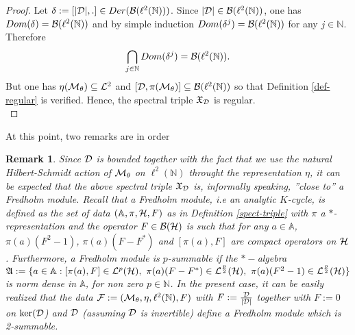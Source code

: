 \documentclass[a4paper,11pt,twoside]{article}
\numberwithin{equation}{section}
\newtheorem{remark}[Theorem]{Remark}
\theoremstyle{nonumberplain}
\newtheorem{proof}{Proof}
\begin{document}
\begin{proof}
Let $\delta:=[|{\cal{D}}|,.]\in Der({\cal{B}}(\ell^2(\mathbb{N}))) $. Since $|{\cal{D}}|\in{\cal{B}}(\ell^2(\mathbb{N}))$, one has $Dom(\delta)={\cal{B}}(\ell^2(\mathbb{N}))$ and by simple induction $Dom(\delta^j)={\cal{B}}(\ell^2(\mathbb{N}))$ for any $j\in\mathbb{N}$. Therefore
\begin{equation}
\bigcap_{j\in\mathbb{N}}Dom(\delta^j)={\cal{B}}(\ell^2(\mathbb{N}))\label{rhs-regular}.
\end{equation}
But one has $\eta({\cal{M}}_\theta)\subseteq{\cal{L}}^2$ and $[{\cal{D}},\pi({\cal{M}}_\theta)]\subseteq{\cal{B}}(\ell^2(\mathbb{N}))$ so that Definition \ref{def-regular} is verified. Hence, the spectral triple $\mathfrak{X}_{{\cal{D}}}$ is regular.\\
\end{proof}

\noindent At this point, two remarks are in order

\begin{remark}
Since ${\cal{D}}$ is bounded together with the fact that we use the natural Hilbert-Schmidt action of ${\cal{M}}_\theta$ on $\ell^2(\mathbb{N})$ throught the representation $\eta$, it can be expected that the above spectral triple $\mathfrak{X}_{{\cal{D}}}$ is, informally speaking, ''close to'' a Fredholm module. Recall that a Fredholm module, i.e an analytic $K$-cycle, is defined as the set of data $(\mathbb{A},\pi,{\cal{H}},F)$ as in Definition \ref{spect-triple} with $\pi$ a $*$-representation and the operator $F\in{\cal{B}}({\cal{H}})$ is such that for any $a\in\mathbb{A}$, $\pi(a)(F^2-1)$, $\pi(a)(F-F^*)$ and $[\pi(a),F]$ are compact operators on ${\cal{H}}$. Furthermore, a Fredholm module is $p$-summable if the $*-$algebra $\mathfrak{A}:=\{a\in\mathbb{A}: [\pi(a),F]\in{\cal{L}}^p({\cal{H}}),\ \pi(a)(F-F^*)\in{\cal{L}}^{\frac{p}{2}}({\cal{H}}),\ \pi(a)(F^2-1)\in{\cal{L}}^{\frac{p}{2}}({\cal{H}})\}$ is norm dense in $\mathbb{A}$, for non zero $p\in\mathbb{N}$. In the present case, it can be easily realized that the data ${\cal{F}}:=({\cal{M}}_\theta,\eta,\ell^2(\mathbb{N}), F)$ with $F:=\frac{{\cal{D}}}{|{\cal{D}}|}$ together with $F:=0$ on $\ker({\cal{D}}$) and ${\cal{D}}$ (assuming ${\cal{D}}$ is invertible) define a Fredholm module which is 2-summable.
\end{remark}
\end{document}
